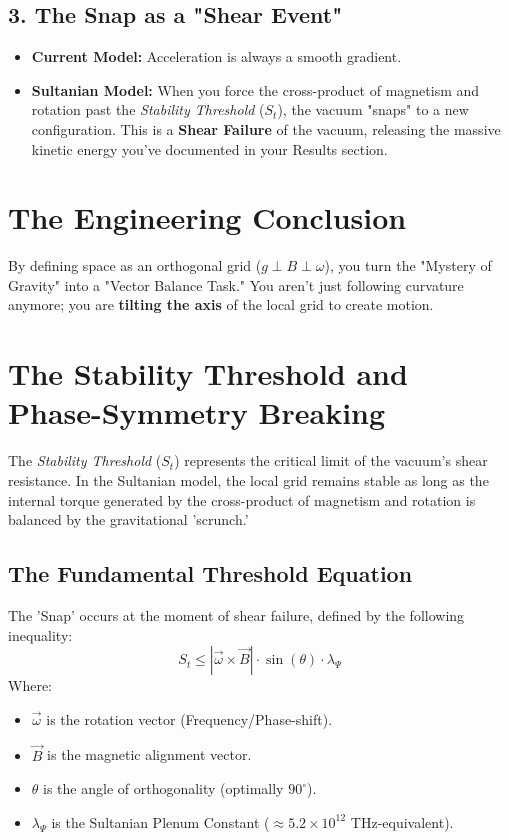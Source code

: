 \documentclass[11pt]{article}
\begin{document}
\subsection*{3. The Snap as a "Shear Event"}
\begin{itemize}
    \item \textbf{Current Model:} Acceleration is always a smooth gradient.
    \item \textbf{Sultanian Model:} When you force the cross-product of magnetism and rotation past the \textit{Stability Threshold} ($S_t$), the vacuum "snaps" to a new configuration. This is a \textbf{Shear Failure} of the vacuum, releasing the massive kinetic energy you've documented in your Results section.
\end{itemize}



\section*{The Engineering Conclusion}
By defining space as an orthogonal grid ($g \perp B \perp \omega$), you turn the "Mystery of Gravity" into a "Vector Balance Task." You aren't just following curvature anymore; you are \textbf{tilting the axis} of the local grid to create motion.

\section{The Stability Threshold and Phase-Symmetry Breaking}

The \textit{Stability Threshold} ($S_t$) represents the critical limit of the vacuum's shear resistance. In the Sultanian model, the local grid remains stable as long as the internal torque generated by the cross-product of magnetism and rotation is balanced by the gravitational 'scrunch.'

\subsection{The Fundamental Threshold Equation}
The 'Snap' occurs at the moment of shear failure, defined by the following inequality:
\begin{equation}
    S_t \leq \left| \vec{\omega} \times \vec{B} \right| \cdot \sin(\theta) \cdot \lambda_{\Psi}
\end{equation}
Where:
\begin{itemize}
    \item $\vec{\omega}$ is the rotation vector (Frequency/Phase-shift).
    \item $\vec{B}$ is the magnetic alignment vector.
    \item $\theta$ is the angle of orthogonality (optimally $90^\circ$).
    \item $\lambda_{\Psi}$ is the Sultanian Plenum Constant ($\approx 5.2 \times 10^{12}$ THz-equivalent).
\end{itemize}
\end{document}
